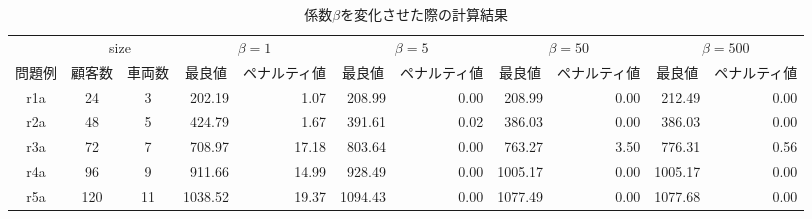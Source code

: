 

\begin{landscape}
  \begin{table}[]
  \caption{係数$\beta$を変化させた際の計算結果}
  \label{beta}
  \begin{tabular}{cllrrrrrrrr}
  \hline
  \multicolumn{1}{l}{} & \multicolumn{2}{c}{size}                          & \multicolumn{2}{c}{$\beta=1$}                               & \multicolumn{2}{c}{$\beta=5$}                              & \multicolumn{2}{c}{$\beta=50$}                              & \multicolumn{2}{c}{$\beta=500$}                             \\ \cline{2-11}
  問題例                  & \multicolumn{1}{r}{顧客数} & \multicolumn{1}{r}{車両数} & \multicolumn{1}{c}{最良値} & \multicolumn{1}{c}{ペナルティ値} & \multicolumn{1}{c}{最良値} & \multicolumn{1}{c}{ペナルティ値} & \multicolumn{1}{c}{最良値} & \multicolumn{1}{c}{ペナルティ値} & \multicolumn{1}{c}{最良値} & \multicolumn{1}{c}{ペナルティ値} \\ \cline{2-11}
  r1a                  & \multicolumn{1}{c}{24}  & \multicolumn{1}{c}{3}   & 202.19                        & 1.07                         & 208.99                       & 0.00                      & 208.99                        & 0.00                        & 212.49                        & 0.00                        \\
  r2a                  & \multicolumn{1}{c}{48}  & \multicolumn{1}{c}{5}   & 424.79                        & 1.67                        & 391.61                      & 0.02                        & 386.03                        & 0.00                        & 386.03                        & 0.00                         \\
  r3a                  & \multicolumn{1}{c}{72}  & \multicolumn{1}{c}{7}   & 708.97                        & 17.18                         & 803.64                        & 0.00                       & 763.27                        & 3.50                        & 776.31                        & 0.56                         \\
  r4a                  & \multicolumn{1}{c}{96}  & \multicolumn{1}{c}{9}   & 911.66                        & 14.99                      & 928.49                        & 0.00                        & 1005.17                       & 0.00                     & 1005.17                        & 0.00                        \\
  r5a                  & \multicolumn{1}{c}{120}  & \multicolumn{1}{c}{11}   & 1038.52                       & 19.37                      & 1094.43                        & 0.00                        & 1077.49                       & 0.00                        & 1077.68                        & 0.00                         \\

\end{tabular}
\end{table}
\end{landscape}
